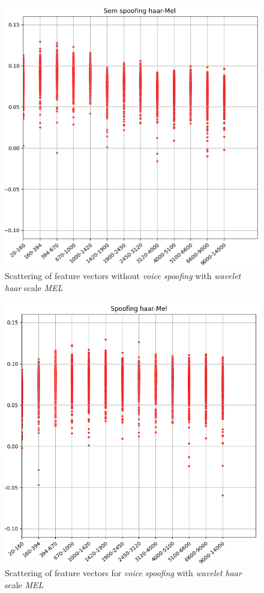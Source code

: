 \begin{figure}[!h]
	\centering
	\includegraphics[width=.70\linewidth, height=.68\linewidth]{images/results/barkVersusMel/liveHaarMel}
	\caption{Scattering of feature vectors without \textit{voice spoofing} with \textit{wavelet haar} scale \textit{MEL}}
	\label{fig:livehaarmel}
\end{figure}

\begin{figure}[!h]
	\centering
	\includegraphics[width=.70\linewidth, height=.68\linewidth]{images/results/barkVersusMel/spoofingHaarMel}
	\caption{Scattering of feature vectors for \textit{voice spoofing} with \textit{wavelet haar} scale \textit{MEL}}
	\label{fig:spoofinghaarmel}
\end{figure}

